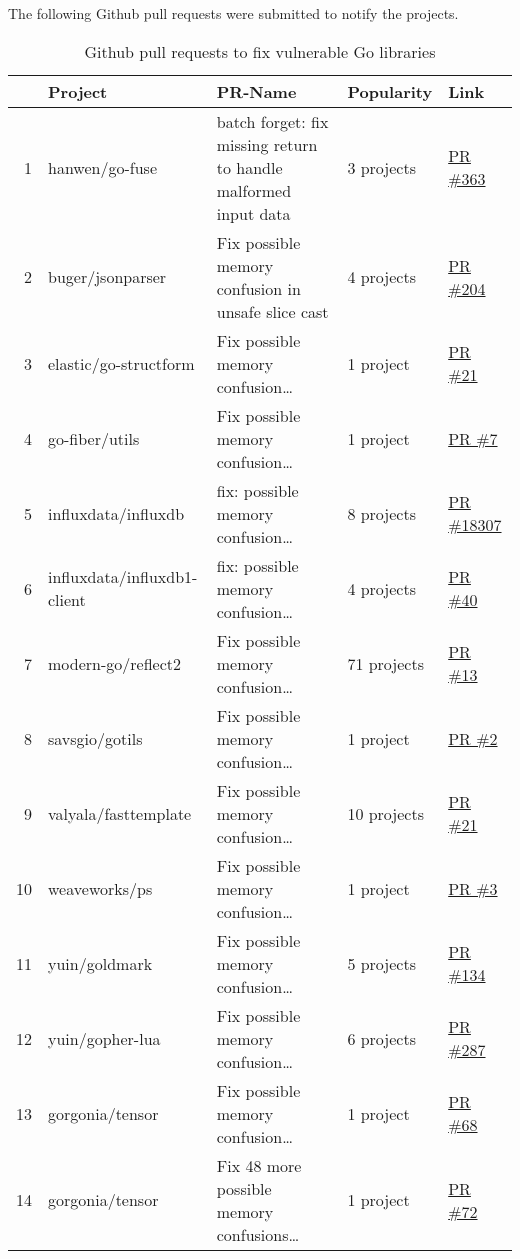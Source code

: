 The following Github pull requests were submitted to notify the projects.

\begin{table}[h]
    \centering
    \caption{Github pull requests to fix vulnerable Go libraries}
    \label{tbl:pull-requests}
    \begin{tabularx}{\textwidth}{rlXll}
        \toprule
        {} & Project & PR-Name & Popularity & Link \\
        \midrule
        1  & hanwen/go-fuse & batch forget: fix missing return to handle malformed input data & 3 projects & \href{https://www.github.com/hanwen/go-fuse/pull/363}{PR \#363} \\
        2  & buger/jsonparser & Fix possible memory confusion in unsafe slice cast & 4 projects & \href{https://www.github.com/buger/jsonparser/pull/204}{PR \#204} \\
        3  & elastic/go-structform & Fix possible memory confusion\ldots & 1 project & \href{https://github.com/elastic/go-structform/pull/21}{PR \#21} \\
        4  & go-fiber/utils & Fix possible memory confusion\ldots & 1 project & \href{https://github.com/gofiber/utils/pull/7}{PR \#7} \\
        5  & influxdata/influxdb & fix: possible memory confusion\ldots & 8 projects & \href{https://github.com/influxdata/influxdb/pull/18307}{PR \#18307} \\
        6  & influxdata/influxdb1-client & fix: possible memory confusion\ldots & 4 projects & \href{https://github.com/influxdata/influxdb1-client/pull/40}{PR \#40} \\
        7  & modern-go/reflect2 & Fix possible memory confusion\ldots & 71 projects & \href{https://github.com/modern-go/reflect2/pull/13}{PR \#13} \\
        8  & savsgio/gotils & Fix possible memory confusion\ldots & 1 project & \href{https://github.com/savsgio/gotils/pull/2}{PR \#2} \\
        9  & valyala/fasttemplate & Fix possible memory confusion\ldots & 10 projects & \href{https://github.com/valyala/fasttemplate/pull/21}{PR \#21} \\
        10 & weaveworks/ps & Fix possible memory confusion\ldots & 1 project & \href{https://github.com/weaveworks/ps/pull/3}{PR \#3} \\
        11 & yuin/goldmark & Fix possible memory confusion\ldots & 5 projects & \href{https://github.com/yuin/goldmark/pull/134}{PR \#134} \\
        12 & yuin/gopher-lua & Fix possible memory confusion\ldots & 6 projects & \href{https://github.com/yuin/gopher-lua/pull/287}{PR \#287} \\
        13 & gorgonia/tensor & Fix possible memory confusion\ldots & 1 project & \href{https://github.com/gorgonia/tensor/pull/68}{PR \#68} \\
        14 & gorgonia/tensor & Fix 48 more possible memory confusions\ldots & 1 project & \href{https://github.com/gorgonia/tensor/pull/72}{PR \#72} \\
        \bottomrule
    \end{tabularx}
\end{table}

